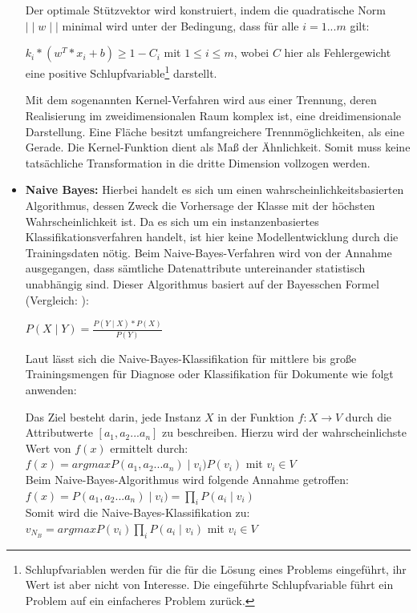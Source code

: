 \begin{itemize}
Der optimale Stützvektor wird konstruiert, indem die quadratische Norm \(\mid \mid w \mid \mid\) minimal wird unter der Bedingung, dass für alle \(i = 1...m\) gilt: 

\(k_i*(w^T * x_i+b) \geq 1 -C_i \) mit \(1 \leq i \leq m\), wobei \(C\) hier als Fehlergewicht eine positive Schlupfvariable\footnote{Schlupfvariablen werden für die für die Lösung eines Problems eingeführt, ihr Wert ist aber nicht von Interesse. Die eingeführte Schlupfvariable führt ein Problem auf ein einfacheres Problem zurück.} darstellt.  

Mit dem sogenannten Kernel-Verfahren wird aus einer Trennung, deren Realisierung im zweidimensionalen Raum komplex ist, eine dreidimensionale Darstellung. Eine Fläche besitzt umfangreichere Trennmöglichkeiten, als eine Gerade. Die Kernel-Funktion dient als Maß der Ähnlichkeit. Somit muss keine tatsächliche Transformation in die dritte Dimension vollzogen werden.  

\item \textbf{Naive Bayes:} Hierbei handelt es sich um einen wahrscheinlichkeitsbasierten Algorithmus, dessen Zweck die Vorhersage der Klasse mit der höchsten Wahrscheinlichkeit ist. Da es sich um ein instanzenbasiertes Klassifikationsverfahren handelt, ist hier keine Modellentwicklung durch die Trainingsdaten nötig. Beim Naive-Bayes-Verfahren wird von der Annahme ausgegangen, dass sämtliche Datenattribute untereinander statistisch unabhängig sind. Dieser Algorithmus basiert auf der Bayesschen Formel (Vergleich: ):

\(P(X \mid Y) = \frac{P(Y \mid X) * P(X)}{P(Y)} \)

Laut  lässt sich die Naive-Bayes-Klassifikation für mittlere bis große Trainingsmengen für Diagnose oder Klassifikation für Dokumente wie folgt anwenden:

Das Ziel besteht darin, jede Instanz \(X\) in der Funktion \(f: X \to V\) durch die Attributwerte \([a_1, a_2...a_n]\) zu beschreiben. 
Hierzu wird der wahrscheinlichste Wert von \(f(x)\) ermittelt durch: \\  
\(f(x) = argmax P(a_1, a_2...a_n) \mid v_i)P(v_i) \) mit  \(v_i \in V \) \\
Beim Naive-Bayes-Algorithmus wird folgende Annahme getroffen: \\ 
 \(f(x) = P(a_1, a_2...a_n) \mid v_i) = \prod_i P(a_i \mid v_i) \) \\
Somit wird die Naive-Bayes-Klassifikation zu:  \\
\(v_N_B = argmax P(v_i) \prod_i P(a_i \mid v_i) \) mit \( v_i \in V \)  \\


\end{itemize}
